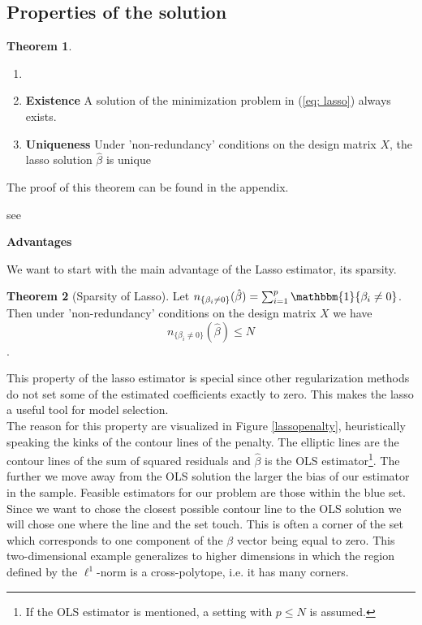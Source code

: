 \documentclass{article}
\theoremstyle{definition}
\newtheorem{theorem}{Theorem}
\begin{document}
\subsection{Properties of the solution}

\begin{theorem}
	\begin{enumerate}
		\item []
		\item \textbf{Existence} A solution of the minimization problem in (\ref{eq: lasso}) always exists.
		\item \textbf{Uniqueness} Under 'non-redundancy' conditions on the design matrix $X$, the lasso solution $\hat{\beta}$ is unique 
	\end{enumerate}

\bigskip
\noindent The proof of this theorem can be found in the appendix.
	
\end{theorem}

see \citep{rosset2004boosting}


\noindent\textbf{Advantages}

We want to start with the main advantage of the Lasso estimator, its sparsity.

\begin{theorem}[Sparsity of Lasso] \label{theo: sparsity_lasso}
	Let $n_{\{\beta_i\neq 0\}}(\hat{\beta}) = \sum_{i=1}^{p} \mathbbm{1} \{\beta_i \neq 0\}$.
	Then under 'non-redundancy' conditions on the design matrix $X$ we have 
	\begin{equation}
		n_{\{\beta_i\neq 0\}}(\hat{\beta}) \leq N
	\end{equation}.
\end{theorem}

This property of the lasso estimator is special since other regularization methods do not set some of the estimated coefficients exactly to zero. This makes the lasso a useful tool for model selection. \\
The reason for this property are visualized in Figure \ref{lassopenalty}, heuristically speaking the kinks of the contour lines of the penalty.
The elliptic lines are the contour lines of the sum of squared residuals and  $\hat{\beta}$ is the OLS estimator\footnote{If the OLS estimator is mentioned, a setting with $p\leq N$ is assumed.}. 
The further we move away from the OLS solution the larger the bias of our estimator in the sample.
Feasible estimators for our problem are those within the blue set.
Since we want to chose the closest possible contour line to the OLS solution we will chose one where the line and the set touch.
This is often a corner of the set which corresponds to one component of the $\beta$ vector being equal to zero. This two-dimensional example generalizes to higher dimensions in which the region defined by the $\ell^1$-norm is a cross-polytope, i.e. it has many corners. \newline
\end{document}
